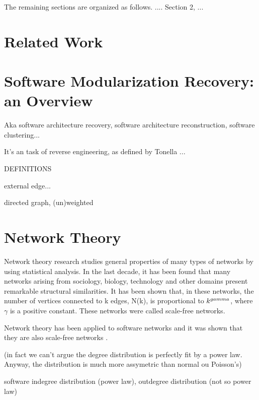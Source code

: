 The remaining sections are organized as follows. .... Section 2, ...


\section{Related Work}

\section{Software Modularization Recovery: an Overview}

Aka software architecture recovery, software architecture reconstruction,
software clustering...

It's an task of reverse engineering, as defined by Tonella \cite{Tonella2007}...

DEFINITIONS

external edge...


directed graph, (un)weighted

\section{Network Theory}

Network theory research studies general properties of many types of networks by
using statistical analysis. In the last decade, it has been found that many
networks arising from sociology, biology, technology and other domains present
remarkable structural similarities. It has been shown that, in these networks,
the number of vertices connected to k edges, N(k), is proportional to
$k^{\-gamma}$, where $\gamma$ is a positive constant. These networks were called
scale-free networks.

Network theory has been applied to software networks and it was shown that they
are also scale-free networks \cite{Myers2003,Valverde2003}.

(in fact we can't argue the degree distribution is perfectly fit by a power law.
Anyway, the distribution is much more assymetric than normal ou Poisson's)

software indegree distribution (power law), outdegree distribution (not so power
law)

